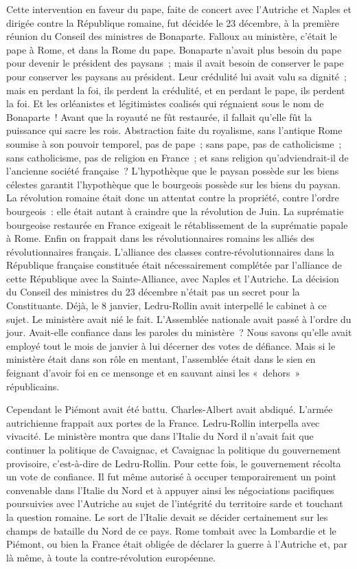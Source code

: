 \documentclass[french,twoside]{book} %
\begin{document}
Cette intervention en faveur du pape, faite de concert avec l’Autriche et Naples et dirigée contre la République romaine, fut décidée le 23 décembre, à la première réunion du Conseil des ministres de Bonaparte. Falloux au ministère, c’était le pape à Rome, et dans la Rome du pape. Bonaparte n’avait plus besoin du pape pour devenir le président des paysans ; mais il avait besoin de conserver le pape pour conserver les paysans au président. Leur crédulité lui avait valu sa dignité ; mais en perdant la foi, ils perdent la crédulité, et en perdant le pape, ils perdent la foi. Et les orléanistes et légitimistes coalisés qui régnaient sous le nom de Bonaparte ! Avant que la royauté ne fût restaurée, il fallait qu’elle fût la puissance qui sacre les rois. Abstraction faite du royalisme, sans l’antique Rome soumise à son pouvoir temporel, pas de pape ; sans pape, pas de catholicisme ; sans catholicisme, pas de religion en France ; et sans religion qu’adviendrait-il de l’ancienne société française ? L’hypothèque que le paysan possède sur les biens célestes garantit l’hypothèque que le bourgeois possède sur les biens du paysan. La révolution romaine était donc un attentat contre la propriété, contre l’ordre bourgeois : elle était autant à craindre que la révolution de Juin. La suprématie bourgeoise restaurée en France exigeait le rétablissement de la suprématie papale à Rome. Enfin on frappait dans les révolutionnaires romains les alliés des révolutionnaires français. L’alliance des classes contre-révolutionnaires dans la République française constituée était nécessairement complétée par l’alliance de cette République avec la Sainte-Alliance, avec Naples et l’Autriche. La décision du Conseil des ministres du 23 décembre n’était pas un secret pour la Constituante. Déjà, le 8 janvier, Ledru-Rollin avait interpellé le cabinet à ce sujet. Le ministère avait nié le fait. L’Assemblée nationale avait passé à l’ordre du jour. Avait-elle confiance dans les paroles du ministère ? Nous savons qu’elle avait employé tout le mois de janvier à lui décerner des votes de défiance. Mais si le ministère était dans son rôle en mentant, l’assemblée était dans le sien en feignant d’avoir foi en ce mensonge et en sauvant ainsi les « dehors » républicains.\par
Cependant le Piémont avait été battu. Charles-Albert avait abdiqué. L’armée autrichienne frappait aux portes de la France. Ledru-Rollin interpella avec vivacité. Le ministère montra que dans l’Italie du Nord il n’avait fait que continuer la politique de Cavaignac, et Cavaignac la politique du gouvernement provisoire, c’est-à-dire de Ledru-Rollin. Pour cette fois, le gouvernement récolta un vote de confiance. Il fut même autorisé à occuper temporairement un point convenable dans l’Italie du Nord et à appuyer ainsi les négociations pacifiques poursuivies avec l’Autriche au sujet de l’intégrité du territoire sarde et touchant la question romaine. Le sort de l’Italie devait se décider certainement sur les champs de bataille du Nord de ce pays. Rome tombait avec la Lombardie et le Piémont, ou bien la France était obligée de déclarer la guerre à l’Autriche et, par là même, à toute la contre-révolution européenne.\par
\end{document}
